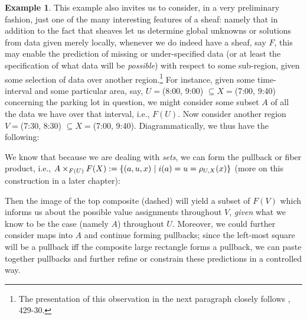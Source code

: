\documentclass[a4paper]{book}
\theoremstyle{definition}
\newtheorem{example}{Example}[section]
\theoremstyle{definition}
\theoremstyle{definition}
\theoremstyle{theorem}
\theoremstyle{definition}
\begin{document}
\begin{example}
	This example also invites us to consider, in a very preliminary fashion, just one of the many interesting features of a sheaf: namely that in addition to the fact that sheaves let us determine global unknowns or solutions from data given merely locally, whenever we do indeed have a sheaf, say $F$, this may enable the prediction of missing or under-specified data (or at least the specification of what data will be \textit{possible}) with respect to some sub-region, given some selection of data over another region.\footnote{The presentation of this observation in the next paragraph closely follows \cite{spivak_category_2014}, 429-30.} For instance, given some time-interval and some particular area, say, $U = $(8:00, 9:00) $\subseteq  X = $(7:00, 9:40) concerning the parking lot in question, we might consider some subset $A$ of all the data we have over that interval, i.e., $F(U)$. Now consider another region $V = $(7:30, 8:30) $\subseteq  X = $(7:00, 9:40). Diagrammatically, we thus have the following: 
	\begin{center}  
	\end{center}  
	We know that because we are dealing with \textit{sets}, we can form the pullback or fiber product, i.e., $A \times_{F(U)} F(X) := \{(a,u,x) \hspace*{0.3em}| \hspace*{0.3em} i(a) = u = \rho_{U,X}(x) \}$ (more on this construction in a later chapter):
	\begin{center}  
	\end{center}     
	Then the image of the top composite (dashed) will yield a subset of $F(V)$ which informs us about the possible value assignments throughout $V$, \textit{given} what we know to be the case (namely $A$) throughout $U$. Moreover, we could further consider maps into $A$ and continue forming pullbacks; since the left-most square will be a pullback iff the composite large rectangle forms a pullback, we can paste together pullbacks and further refine or constrain these predictions in a controlled way.
\end{example}
\end{document}
